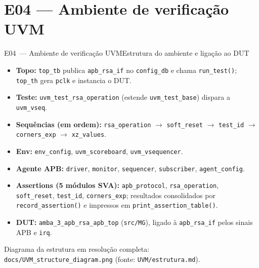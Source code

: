 \documentclass[aspectratio=169,10pt,t]{beamer}
\begin{document}
\section{E04 — Ambiente de verificação UVM}
\begin{frame}{E04~— Ambiente de verificação UVM}{Estrutura do ambiente e ligação ao DUT}
  \small
  \begin{itemize}\setlength{\itemsep}{0.35em}
    \item \textbf{Topo:} \texttt{top\_tb} publica \texttt{apb\_rsa\_if} no \texttt{config\_db} e chama \texttt{run\_test()}; \texttt{top\_th} gera \texttt{pclk} e instancia o DUT.
    \item \textbf{Teste:} \texttt{uvm\_test\_rsa\_operation} (estende \texttt{uvm\_test\_base}) dispara a \texttt{uvm\_vseq}.
    \item \textbf{Sequências (em ordem):} \texttt{rsa\_operation} $\rightarrow$ \texttt{soft\_reset} $\rightarrow$ \texttt{test\_id} $\rightarrow$ \texttt{corners\_exp} $\rightarrow$ \texttt{xz\_values}.
    \item \textbf{Env:} \texttt{env\_config}, \texttt{uvm\_scoreboard}, \texttt{uvm\_vsequencer}.
    \item \textbf{Agente APB:} \texttt{driver}, \texttt{monitor}, \texttt{sequencer}, \texttt{subscriber}, \texttt{agent\_config}.
    \item \textbf{Assertions (5 módulos SVA):} \texttt{apb\_protocol}, \texttt{rsa\_operation}, \texttt{soft\_reset}, \texttt{test\_id}, \texttt{corners\_exp}; resultados consolidados por \texttt{record\_assertion()} e impressos em \texttt{print\_assertion\_table()}.
    \item \textbf{DUT:} \texttt{amba\_3\_apb\_rsa\_apb\_top} (\texttt{src/MG}), ligado à \texttt{apb\_rsa\_if} pelos sinais APB e \texttt{irq}.
  \end{itemize}
  \vfill
  {\tiny Diagrama da estrutura em resolução completa: \texttt{docs/UVM\_structure\_diagram.png} (fonte: \texttt{UVM/estrutura.md}).}
\end{frame}
\end{document}
